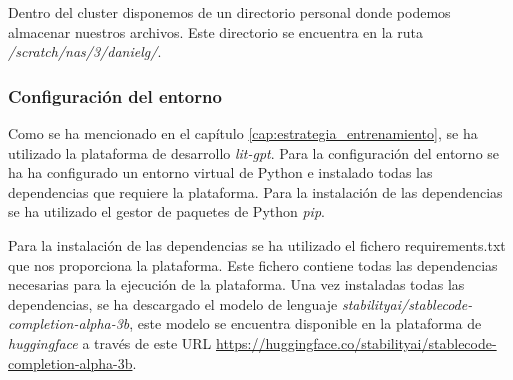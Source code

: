 Dentro del cluster disponemos de un directorio personal donde podemos almacenar nuestros
archivos. Este directorio se encuentra en la ruta \textit{/scratch/nas/3/danielg/}.

\subsubsection{Configuración del entorno}
\label{subsubsec:configuracion_entorno}


Como se ha mencionado en el capítulo \ref{cap:estrategia_entrenamiento}, se ha utilizado
la plataforma de desarrollo \textit{lit-gpt}. Para la configuración del entorno se ha
ha configurado un entorno virtual de Python e instalado todas las dependencias que requiere
la plataforma. Para la instalación de las dependencias se ha utilizado el gestor de paquetes
de Python \textit{pip}.

Para la instalación de las dependencias se ha utilizado el fichero requirements.txt que
nos proporciona la plataforma. Este fichero contiene todas las dependencias necesarias
para la ejecución de la plataforma. Una vez instaladas todas las dependencias, se
ha descargado el modelo de lenguaje \textit{stabilityai/stablecode-completion-alpha-3b}, este
modelo se encuentra disponible en la plataforma de \textit{huggingface} a través de este URL
\url{https://huggingface.co/stabilityai/stablecode-completion-alpha-3b}.


